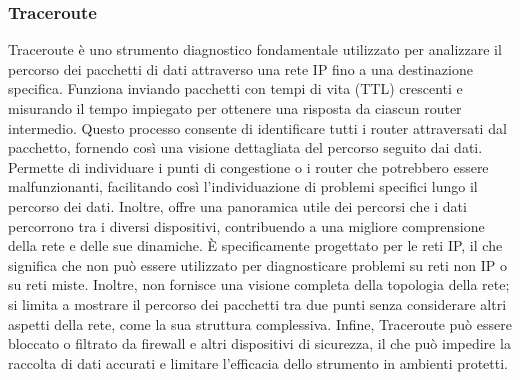 \documentclass[target=bach,aauheader=,style=]{thud}
\begin{document}
\subsubsection{Traceroute}
Traceroute \cite{netbrain_traceroute} è uno strumento diagnostico fondamentale utilizzato per analizzare il percorso dei pacchetti di dati attraverso una rete IP fino a una destinazione specifica. Funziona inviando pacchetti con tempi di vita (TTL) crescenti e misurando il tempo impiegato per ottenere una risposta da ciascun router intermedio. Questo processo consente di identificare tutti i router attraversati dal pacchetto, fornendo così una visione dettagliata del percorso seguito dai dati.
\newline
Permette di individuare i punti di congestione o i router che potrebbero essere malfunzionanti, facilitando così l’individuazione di problemi specifici lungo il percorso dei dati. Inoltre, offre una panoramica utile dei percorsi che i dati percorrono tra i diversi dispositivi, contribuendo a una migliore comprensione della rete e delle sue dinamiche.
\newline È specificamente progettato per le reti IP, il che significa che non può essere utilizzato per diagnosticare problemi su reti non IP o su reti miste. Inoltre, non fornisce una visione completa della topologia della rete; si limita a mostrare il percorso dei pacchetti tra due punti senza considerare altri aspetti della rete, come la sua struttura complessiva. Infine, Traceroute può essere bloccato o filtrato da firewall e altri dispositivi di sicurezza, il che può impedire la raccolta di dati accurati e limitare l’efficacia dello strumento in ambienti protetti.
\end{document}
